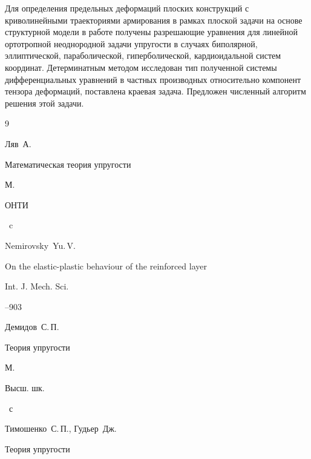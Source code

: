 \smallskip

 Для определения предельных деформаций плоских конструкций с криволинейными траекториями армирования в рамках плоской задачи на основе структурной модели в работе получены разрешающие уравнения для линейной ортотропной неоднородной задачи упругости в случаях биполярной, эллиптической, параболической, гиперболической, кардиоидальной систем координат. Детерминатным методом исследован тип полученной системы дифференциальных уравнений в частных производных относительно компонент тензора деформаций, поставлена краевая задача. Предложен численный алгоритм решения этой задачи.







\begin{thebibliography}{9}




\by Ляв~А.

\book Математическая теория упругости 

\publaddr М.

\publ ОНТИ


~c




\by Nemirovsky~Yu.\,V. 

\paper On the elastic-plastic behaviour of the reinforced layer 

\jour Int. J. Mech. Sci.



--903






\by Демидов~С.\,П.

\book Теория упругости 

\publaddr М.

\publ Высш. шк.


~с




\by Тимошенко~С.\,П., Гудьер~Дж.

\book  Теория упругости 


\end{thebibliography}
